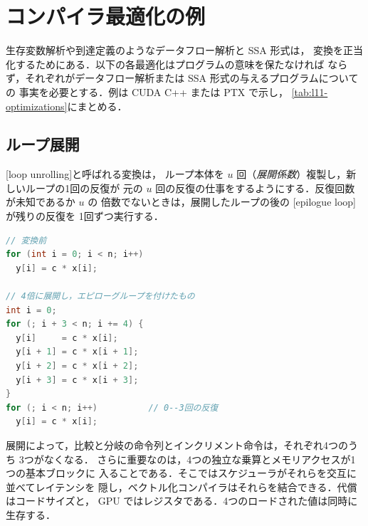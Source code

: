 \documentclass[../main.tex]{subfiles}
\begin{document}
\section{コンパイラ最適化の例}
\label{sec:l11-optimizations}

生存変数解析や到達定義のようなデータフロー解析と SSA 形式は，
変換を正当化するためにある．以下の各最適化はプログラムの意味を保たなければ
ならず，それぞれがデータフロー解析または SSA 形式の与えるプログラムについての
事実を必要とする．例は CUDA C++ または PTX で示し，
\cref{tab:l11-optimizations}にまとめる．

\subsection{ループ展開}

\begin{definition}[ループ展開]
  \label{def:l11-unroll}
  [loop unrolling]と呼ばれる変換は，
  ループ本体を $u$ 回（\emph{展開係数}）複製し，新しいループの1回の反復が
  元の $u$ 回の反復の仕事をするようにする．反復回数が未知であるか $u$ の
  倍数でないときは，展開したループの後の
  [epilogue loop]が残りの反復を
  1回ずつ実行する．
\end{definition}

\begin{lstlisting}[language=C++, numbers=none]
// 変換前
for (int i = 0; i < n; i++)
  y[i] = c * x[i];

// 4倍に展開し，エピローグループを付けたもの
int i = 0;
for (; i + 3 < n; i += 4) {
  y[i]     = c * x[i];
  y[i + 1] = c * x[i + 1];
  y[i + 2] = c * x[i + 2];
  y[i + 3] = c * x[i + 3];
}
for (; i < n; i++)          // 0--3回の反復
  y[i] = c * x[i];
\end{lstlisting}

%
展開によって，比較と分岐の命令列とインクリメント命令は，それぞれ4つのうち
3つがなくなる．
さらに重要なのは，4つの独立な乗算とメモリアクセスが1つの基本ブロックに
入ることである．そこではスケジューラがそれらを交互に並べてレイテンシを
隠し，ベクトル化コンパイラはそれらを結合できる．代償はコードサイズと，
GPU ではレジスタである．4つのロードされた値は同時に生存する．
\end{document}
